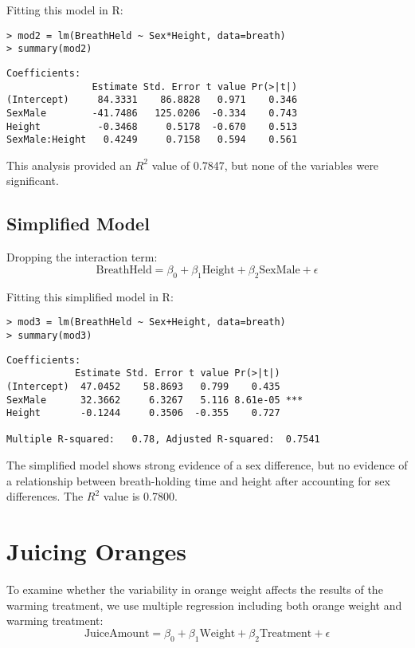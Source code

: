 \documentclass{article}
\begin{document}
Fitting this model in R:
\begin{verbatim}
> mod2 = lm(BreathHeld ~ Sex*Height, data=breath)
> summary(mod2)
\end{verbatim}
\begin{verbatim}
Coefficients:
               Estimate Std. Error t value Pr(>|t|)
(Intercept)     84.3331    86.8828   0.971    0.346
SexMale        -41.7486   125.0206  -0.334    0.743
Height          -0.3468     0.5178  -0.670    0.513
SexMale:Height   0.4249     0.7158   0.594    0.561
\end{verbatim}

This analysis provided an \( R^2 \) value of 0.7847, but none of the variables were significant.

\subsection{Simplified Model}

Dropping the interaction term:
\[
\text{BreathHeld} = \beta_0 + \beta_1 \text{Height} + \beta_2 \text{SexMale} + \epsilon
\]

Fitting this simplified model in R:
\begin{verbatim}
> mod3 = lm(BreathHeld ~ Sex+Height, data=breath)
> summary(mod3)
\end{verbatim}
\begin{verbatim}
Coefficients:
            Estimate Std. Error t value Pr(>|t|)    
(Intercept)  47.0452    58.8693   0.799    0.435    
SexMale      32.3662     6.3267   5.116 8.61e-05 ***
Height       -0.1244     0.3506  -0.355    0.727    

Multiple R-squared:   0.78,	Adjusted R-squared:  0.7541 
\end{verbatim}

The simplified model shows strong evidence of a sex difference, but no evidence of a relationship between breath-holding time and height after accounting for sex differences. The \( R^2 \) value is 0.7800.

\section{Juicing Oranges}

To examine whether the variability in orange weight affects the results of the warming treatment, we use multiple regression including both orange weight and warming treatment:
\[
\text{JuiceAmount} = \beta_0 + \beta_1 \text{Weight} + \beta_2 \text{Treatment} + \epsilon
\]
\end{document}
